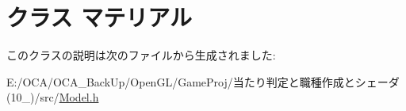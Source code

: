 \hypertarget{class_xE3_x83_x9E_xE3_x83_x86_xE3_x83_xAA_xE3_x82_xA2_xE3_x83_xAB}{\section{クラス マテリアル}
\label{class_xE3_x83_x9E_xE3_x83_x86_xE3_x83_xAA_xE3_x82_xA2_xE3_x83_xAB}
}


このクラスの説明は次のファイルから生成されました\-:\begin{DoxyCompactItemize}
\item 
E\-:/\-O\-C\-A/\-O\-C\-A\-\_\-\-Back\-Up/\-Open\-G\-L/\-Game\-Proj/当たり判定と職種作成とシェーダ(10\-\_)/src/\hyperlink{_model_8h}{Model.\-h}\end{DoxyCompactItemize}
